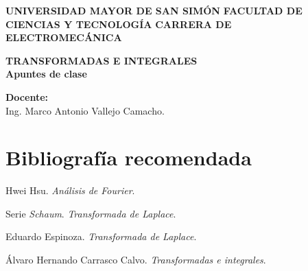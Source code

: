 \documentclass[letter,oneside,11pt]{book}
\begin{document}
\begin{titlepage}
    \begin{center}
        \begin{minipage}[]{.55\linewidth}
            \centering
            \large{\textbf{UNIVERSIDAD MAYOR DE SAN SIMÓN}} \newline
            \large{\textbf{FACULTAD DE CIENCIAS Y TECNOLOGÍA}} \newline
            \large{\textbf{CARRERA DE ELECTROMECÁNICA}} \newline
        \end{minipage}

        \vspace*{8.4cm}
        {\Large \textbf{TRANSFORMADAS E INTEGRALES}}\\
        \vspace*{0.3cm}
        {\Large \textbf{Apuntes de clase}}\\
    \end{center}

    \vspace*{8.4cm}
    \leftskip=7.95cm
    \noindent
    \textbf{Docente:}\\
    Ing. Marco Antonio Vallejo Camacho.\\
\end{titlepage}

\clearpage
\setcounter{page}{1}

\tableofcontents
\newpage

\section*{Bibliografía recomendada}
\begin{enumerate}[{label=[\arabic{*}]}]
\item Hwei Hsu. \emph{Análisis de Fourier}.
\item Serie \emph{Schaum}. \emph{Transformada de Laplace}.
\item Eduardo Espinoza. \emph{Transformada de Laplace}.
\item Álvaro Hernando Carrasco Calvo. \emph{Transformadas e integrales}.
\end{enumerate}




%
%
%
%
\end{document}
